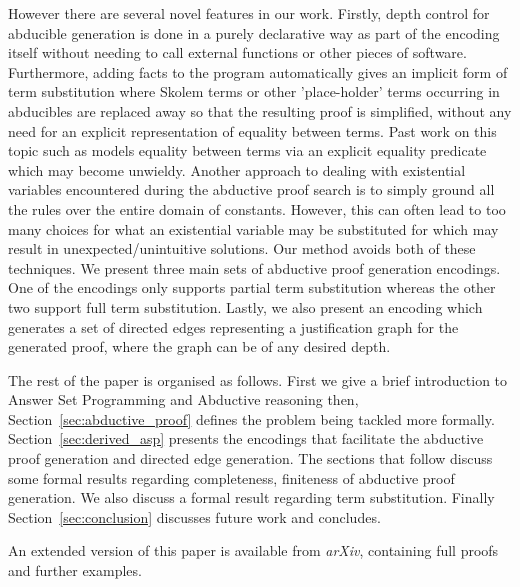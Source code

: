 However there are several novel features in our work.  Firstly, depth  control for abducible generation is done in a purely declarative way as part of the encoding itself without needing to call external functions or other pieces of software. Furthermore, adding facts to the program automatically gives an implicit form of term substitution where Skolem terms or
other 'place-holder' terms occurring in abducibles are replaced away so that
the resulting proof is simplified, without any need for an explicit representation of equality between terms. Past work on this topic such as \cite{schueller16:_model_variat_first_order_horn} models equality between terms via an explicit equality predicate which may become unwieldy. Another approach to dealing with existential variables encountered during the abductive proof search is to simply ground all the rules over the entire domain of constants. However, this can often lead to too many choices for what an existential variable may be substituted for which may result in unexpected/unintuitive solutions. Our method avoids both of these techniques. We present three main sets of abductive proof generation encodings. One of the encodings only supports partial term substitution whereas the other two support full term substitution. Lastly, we also present an encoding which generates a set of directed edges representing a justification 
graph  for the generated proof, where the graph can be of any desired depth.

The rest of the paper is organised as
follows. First we give a brief introduction to Answer Set Programming and Abductive reasoning then, Section~\ref{sec:abductive_proof} defines the problem being tackled more formally. Section~\ref{sec:derived_asp} presents the encodings that facilitate the abductive proof generation and directed edge generation. The sections that follow discuss some formal results regarding completeness, finiteness of abductive proof generation. We also discuss a formal result regarding term substitution. Finally Section~\ref{sec:conclusion} discusses
future work and concludes.

An extended version of this paper \cite{extended_version} is available from
\emph{arXiv}, containing full proofs and further examples.

